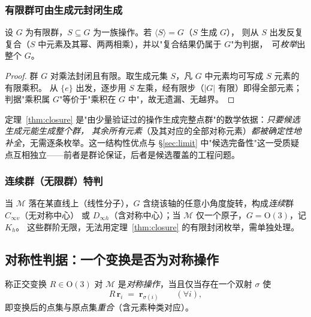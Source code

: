 \subsubsection{有限群可由生成元封闭生成}
\begin{theorem}[生成元与群封闭]\label{thm:closure}
  设 $G$ 为有限群，$S\subseteq G$ 为一族操作。若 $\langle S\rangle = G$（$S$ 生成 $G$），
  则从 $S$ 出发反复复合（$S$ 中元素及其幂、两两相乘），并以"复合结果仍属于 $G$"为判据，\
  可\emph{枚举}出整个 $G$。
\end{theorem}
\begin{proof}
  群 $G$ 对乘法封闭且有限。取生成元集 $S$，凡 $G$ 中元素均可写成 $S$ 元素的有限乘积。
  从 $\{e\}$ 出发，逐步用 $S$ 左乘，经有限步（$|G|$ 有限）即得全部元素；
  判据"乘积属 $G$"等价于"乘积在 $G$ 中"，故无遗漏、无越界。\qedhere
\end{proof}

定理~\ref{thm:closure} 是"由少量验证过的操作生成完整点群"的数学依据：\emph{只要候选生成元能生成整个群，
其余所有元素}（及其对应的全部对称元素）\emph{都被确定性地补全}，无需逐条枚举。这一结构性优点与 §\ref{sec:limit}
中"候选完备性"这一受质疑点互相独立——前者是群论保证，后者是候选覆盖的工程问题。

\subsubsection{连续群（无限群）特判}
当 $\mathcal M$ 落在某直线上（线性分子），$G$ 含绕该轴的任意小角度旋转，构成\emph{连续}群 $C_{\infty v}$（无对称中心）
或 $D_{\infty h}$（含对称中心）；当 $\mathcal M$ 仅一个原子，$G=\mathrm{O}(3)$，记 $K_h$。
这些群阶无限，无法用定理~\ref{thm:closure} 的有限封闭枚举，需单独处理。

\subsection{对称性判据：一个变换是否为对称操作}\label{sec:criteria}

\begin{definition}[对称操作判据]\label{def:op}
  称正交变换 $R\in\mathrm{O}(3)$ 对 $\mathcal M$ 是\emph{对称操作}，当且仅当存在一个双射 $\sigma$
  使
  \begin{equation}
    R\,\mathbf r_i \;=\; \mathbf r_{\sigma(i)} \qquad(\forall i),
  \end{equation}
  即变换后的点集与原点集\emph{重合}（含元素种类对应）。
\end{definition}

